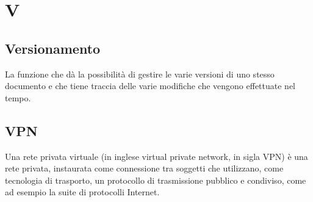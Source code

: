 \section{V}

\subsection{Versionamento}
La funzione che dà la possibilità di gestire le varie versioni di uno stesso documento e che tiene traccia delle varie modifiche che vengono effettuate nel tempo.

\subsection{VPN}
Una rete privata virtuale (in inglese virtual private network, in sigla VPN) è una rete privata, instaurata come connessione tra soggetti che utilizzano, come tecnologia di trasporto, un protocollo di trasmissione pubblico e condiviso, come ad esempio la suite di protocolli Internet.



\clearpage